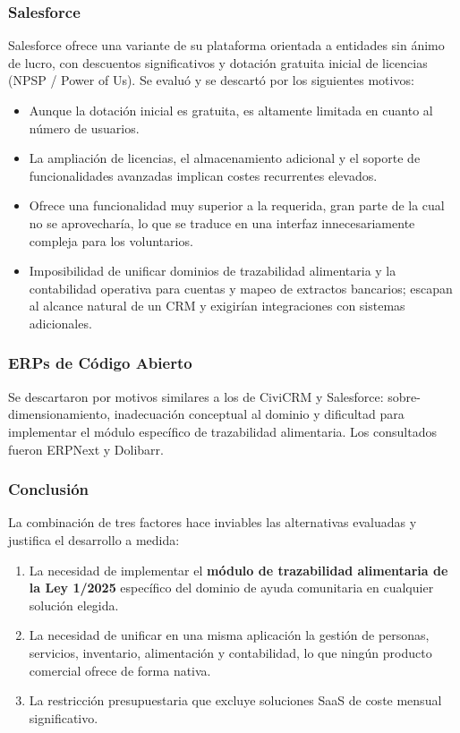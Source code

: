 \subsubsection{Salesforce}
Salesforce ofrece una variante de su plataforma orientada a entidades sin
ánimo de lucro, con descuentos significativos y dotación gratuita inicial
de licencias (NPSP / Power of Us). Se evaluó y se descartó por los
siguientes motivos:
\begin{itemize}
    \item Aunque la dotación inicial es
    gratuita, es altamente limitada en cuanto al número de usuarios. 
    \item La ampliación de licencias, el almacenamiento adicional y el
    soporte de funcionalidades avanzadas implican costes recurrentes elevados.
    \item Ofrece una
    funcionalidad muy superior a la requerida, gran parte de la cual no
    se aprovecharía, lo que se traduce en una interfaz innecesariamente
    compleja para los voluntarios.
    \item Imposibilidad de unificar dominios de trazabilidad alimentaria
   y la contabilidad operativa para
    cuentas y mapeo de extractos bancarios; escapan al alcance natural de
    un CRM y exigirían integraciones con sistemas adicionales.
\end{itemize}


\subsubsection{ERPs de Código Abierto}
Se descartaron por motivos similares a los de CiviCRM y Salesforce: sobre-dimensionamiento,
inadecuación conceptual al dominio y dificultad para implementar el
módulo específico de trazabilidad alimentaria. Los consultados fueron ERPNext y Dolibarr.


\subsubsection{Conclusión}
La combinación de tres factores hace inviables las alternativas evaluadas y
justifica el desarrollo a medida:
\begin{enumerate}
    \item La necesidad de implementar el \textbf{módulo de trazabilidad alimentaria de la
    Ley 1/2025} específico del dominio de ayuda comunitaria en cualquier
    solución elegida.

    \item La necesidad de unificar en una misma aplicación la gestión de personas,
    servicios, inventario, alimentación y contabilidad, lo que ningún
    producto comercial ofrece de forma nativa.

    \item La restricción presupuestaria que excluye soluciones SaaS de coste
    mensual significativo.
\end{enumerate}